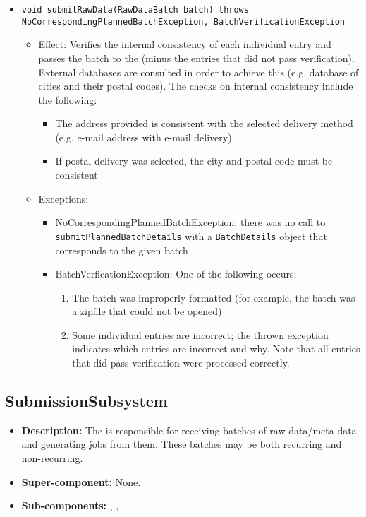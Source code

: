 \begin{itemize}
\begin{itemize}
		\item \texttt{void submitRawData(RawDataBatch batch) throws NoCorrespondingPlannedBatchException, BatchVerificationException}
		\begin{itemize}
			\item Effect: Verifies the internal consistency of each individual entry and passes the batch to the  (minus the entries that did not pass verification). External databases are consulted in order to achieve this (e.g. database of cities and their postal codes). The checks on internal consistency include the following:
			\begin{itemize}
				\item The address provided is consistent with the selected delivery method (e.g. e-mail address with e-mail delivery)
				\item If postal delivery was selected, the city and postal code must be consistent
			\end{itemize}
			\item Exceptions:
			\begin{itemize}
				\item NoCorrespondingPlannedBatchException: there was no call to \texttt{submitPlannedBatchDetails} with a \texttt{BatchDetails} object that corresponds to the given batch
				\item BatchVerficationException: One of the following occurs:
				\begin{enumerate}
					\item The batch was improperly formatted (for example, the batch was a zipfile that could not be opened)
					\item Some individual entries are incorrect; the thrown exception indicates which entries are incorrect and why. Note that all entries that did pass verification were processed correctly.
				\end{enumerate} 
			\end{itemize}
		\end{itemize}
	\end{itemize}
\end{itemize}

\subsection{SubmissionSubsystem}
\begin{itemize}
    \item \textbf{Description:} The  is responsible for receiving batches of raw data/meta-data and generating jobs from them. These batches may be both recurring and non-recurring. 
    \item \textbf{Super-component:} None.
    \item \textbf{Sub-components:} , , .
\end{itemize}

